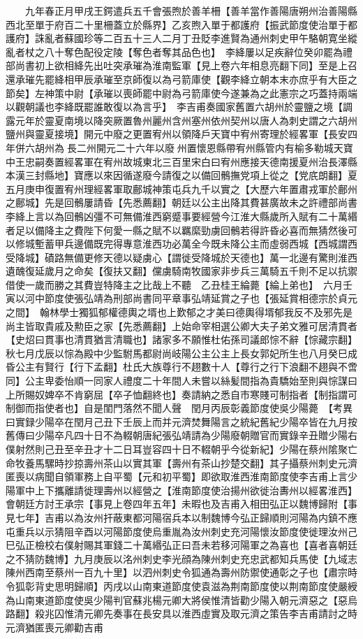 　　九年春正月甲戌王鍔遣兵五千會張煦於善羊柵【善羊當作善陽唐朔州治善陽縣西北至單于府百二十里柵蓋立於縣界】乙亥煦入單于都護府【振武節度使治單于都護府】誅亂者蘇國珍等二百五十三人二月丁丑貶李進賢為通州刺史甲午駱朝寛坐縱亂者杖之八十奪色配役定陵【奪色者奪其品色也】　李絳屢以足疾辭位癸卯罷為禮部尚書初上欲相絳先出吐突承璀為淮南監軍【見上卷六年相息亮翻下同】至是上召還承璀先罷絳相甲辰承璀至京師復以為弓箭庫使【觀李絳立朝本末亦庶乎有大臣之節矣】左神策中尉【承璀以喪師罷中尉為弓箭庫使今遂兼為之此憲宗之巧蓋持兩端以觀朝議也李絳既罷誰敢復以為言乎】　李吉甫奏國家舊置六胡州於靈鹽之境【調露元年於靈夏南境以降突厥置魯州麗州含州塞州依州契州以唐人為刺史謂之六胡州鹽州與靈夏接境】開元中廢之更置宥州以領降戶天寶中宥州寄理於經畧軍【長安四年併六胡州為長二州開元二十六年以廢州置懷恩縣帶宥州縣管内有榆多勒城天寶中王忠嗣奏置經畧軍在宥州故城東北三百里宋白曰宥州應接天德南援夏州治長澤縣本漢三封縣地】寶應以來因循遂廢今請復之以備回鶻撫党項上從之【党㡳朗翻】夏五月庚申復置宥州理經畧軍取鄜城神策屯兵九千以實之【大歷六年置肅戎軍於鄜州之鄜城】先是回鶻屢請昏【先悉薦翻】朝廷以公主出降其費甚廣故未之許禮部尚書李絳上言以為回鶻凶彊不可無備淮西窮蹙事要經營今江淮大縣歲所入賦有二十萬緡者足以備降主之費陛下何愛一縣之賦不以羈縻勁虜回鶻若得許昏必喜而無猜然後可以修城塹蓄甲兵邊備既完得專意淮西功必萬全今既未降公主而虛弱西城【西城謂西受降城】磧路無備更修天德以疑虜心【謂徙受降城於天德也】萬一北邊有驚則淮西遺醜復延歲月之命矣【復扶又翻】儻虜騎南牧國家非步兵三萬騎五千則不足以抗禦借使一歲而勝之其費豈特降主之比哉上不聽　乙丑桂王綸薨【綸上弟也】　六月壬寅以河中節度使張弘靖為刑部尚書同平章事弘靖延賞之子也【張延賞相德宗於貞元之間】　翰林學士獨狐郁權德輿之壻也上歎郁之才美曰德輿得壻郁我反不及邪先是尚主皆取貴戚及勲臣之家【先悉薦翻】上始命宰相選公卿大夫子弟文雅可居清貫者【史炤曰貫事也清貫猶言清職也】諸家多不願惟杜佑孫司議郎悰不辭【悰藏宗翻】秋七月戊辰以悰為殿中少監駙馬都尉尚岐陽公主公主上長女郭妃所生也八月癸巳成昏公主有賢行【行下孟翻】杜氏大族尊行不趐數十人【尊行之行下浪翻不趐與不啻同】公主卑委怡順一同家人禮度二十年間人未嘗以絲髪間指為貴驕始至則與悰謀曰上所賜奴婢卒不肯窮屈【卒子恤翻終也】奏請納之悉自市寒賤可制指者【制指謂可制御而指使者也】自是閨門落然不聞人聲　閏月丙辰彰義節度使吳少陽薨　【考異曰實録少陽卒在閏月己丑下壬辰上而并元濟焚舞陽言之統紀舊紀少陽卒皆在九月按舊傳曰少陽卒凡四十日不為輟朝唐紀張弘靖請為少陽廢朝贈官而實錄辛丑贈少陽右僕射然則己丑至辛丑才十二日耳豈容四十日不輟朝乎今從新紀】少陽在蔡州隂聚亡命牧養馬騾時抄掠壽州茶山以實其軍【壽州有茶山抄楚交翻】其子攝蔡州刺史元濟匿喪以病聞自領軍務上自平蜀【元和初平蜀】即欲取淮西淮南節度使李吉甫上言少陽軍中上下攜離請徙理壽州以經營之【淮南節度使治揚州欲徙治夀州以經畧淮西】會朝廷方討王承宗【事見上卷四年五年】未暇也及吉甫入相田弘正以魏博歸附【事見七年】吉甫以為汝州扞蔽東都河陽宿兵本以制魏博今弘正歸順則河陽為内鎮不應屯重兵以示猜阻辛酉以河陽節度使烏重胤為汝州刺史充河陽懷汝節度使徙理汝州己巳弘正檢校右僕射賜其軍錢二十萬緡弘正曰吾未若移河陽軍之為喜也【喜者喜朝廷之不猜防魏博】九月庚辰以洺州刺史李光顔為陳州刺史充忠武都知兵馬使【九域志陳州西南至蔡州一百九十里】以泗州刺史令狐通為壽州防禦使通彰之子也【肅宗時令狐彰背史思明歸順】丙戌以山南東道節度使袁滋為荆南節度使以荆南節度使嚴綬為山南東道節度使吳少陽判官蘇兆楊元卿大將侯惟清皆勸少陽入朝元濟惡之【惡烏路翻】殺兆囚惟清元卿先奏事在長安具以淮西虛實及取元濟之策告李吉甫請討之時元濟猶匿喪元卿勸吉甫